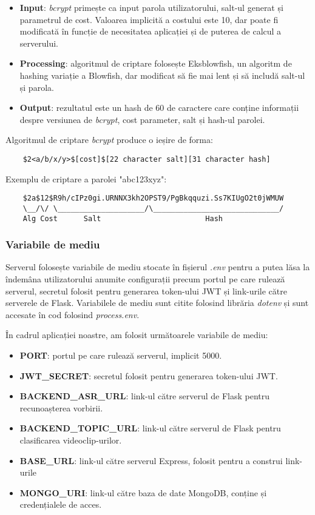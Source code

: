\begin{itemize}
    \item \textbf{Input}: \textit{bcrypt} primește ca input parola utilizatorului, salt-ul generat
    și parametrul de cost. Valoarea implicită a costului este 10, dar poate fi modificată în funcție
    de necesitatea aplicației și de puterea de calcul a serverului.
    \item \textbf{Processing}: algoritmul de criptare folosește Eksblowfish, un algoritm de hashing
    variație a Blowfish, dar modificat să fie mai lent și să includă salt-ul și parola.
    \item \textbf{Output}: rezultatul este un hash de 60 de caractere care conține informații despre
    versiunea de \textit{bcrypt}, cost parameter, salt și hash-ul parolei.
\end{itemize}

\par
Algoritmul de criptare \textit{bcrypt} produce o ieșire de forma:
\begin{verbatim}
    $2<a/b/x/y>$[cost]$[22 character salt][31 character hash]
\end{verbatim}

Exemplu de criptare a parolei "abc123xyz"\footnotemark[1]:
\begin{verbatim}
    $2a$12$R9h/cIPz0gi.URNNX3kh2OPST9/PgBkqquzi.Ss7KIUgO2t0jWMUW
    \__/\/ \____________________/\_____________________________/
    Alg Cost      Salt                        Hash
\end{verbatim}


\subsubsection{Variabile de mediu}
Serverul folosește variabile de mediu stocate în fișierul \textit{.env} pentru a putea lăsa
la îndemâna utilizatorului anumite configurații precum portul pe care rulează serverul, secretul
folosit pentru generarea token-ului JWT și link-urile către serverele de Flask. Variabilele de mediu
sunt citite folosind librăria \textit{dotenv} și sunt accesate în cod folosind \textit{process.env}.
\par
În cadrul aplicației noastre, am folosit următoarele variabile de mediu:
\begin{itemize}
    \item \textbf{PORT}: portul pe care rulează serverul, implicit 5000.
    \item \textbf{JWT\_SECRET}: secretul folosit pentru generarea token-ului JWT.
    \item \textbf{BACKEND\_ASR\_URL}: link-ul către serverul de Flask pentru recunoașterea vorbirii.
    \item \textbf{BACKEND\_TOPIC\_URL}: link-ul către serverul de Flask pentru clasificarea videoclip-urilor.
    \item \textbf{BASE\_URL}: link-ul către serverul Express, folosit pentru a construi link-urile
    \item \textbf{MONGO\_URI}: link-ul către baza de date MongoDB, conține și credențialele de acces.
\end{itemize}


